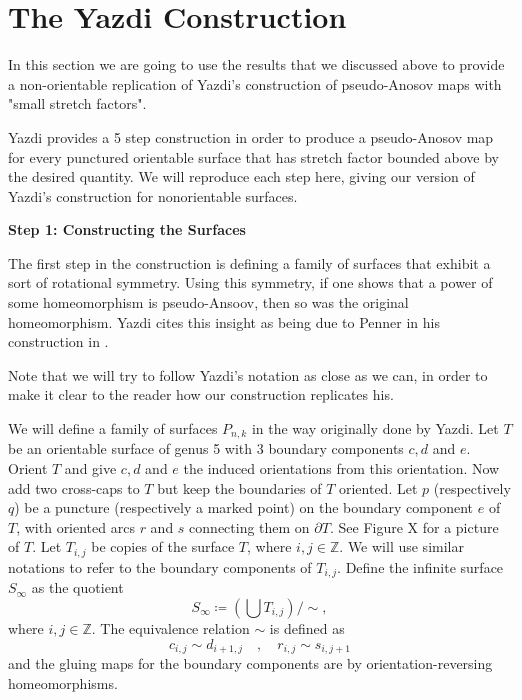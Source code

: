 \section{The Yazdi Construction}

In this section we are going to use the results that we discussed above to provide a non-orientable replication of Yazdi's construction of pseudo-Anosov maps with "small stretch factors".

Yazdi provides a 5 step construction in order to produce a pseudo-Anosov map for every punctured orientable surface that has stretch factor bounded above by the desired quantity. We will reproduce each step here, giving our version of Yazdi's construction for nonorientable surfaces. 

\textbf{Step 1: Constructing the Surfaces} 

The first step in the construction is defining a family of surfaces that exhibit a sort of rotational symmetry. Using this symmetry, if one shows that a power of some homeomorphism is pseudo-Ansoov, then so was the original homeomorphism. Yazdi cites this insight as being due to Penner in his construction in \cite{penner1991bounds}. 

Note that we will try to follow Yazdi's notation as close as we can, in order to make it clear to the reader how our construction replicates his.

We will define a family of surfaces $P_{n,k}$ in the way originally done by Yazdi. Let $T$ be an orientable surface of genus 5 with 3 boundary components $c,d$ and $e$. Orient $T$ and give $c,d$ and $e$ the induced orientations from this orientation. Now add two cross-caps to $T$ but keep the boundaries of $T$ oriented. Let $p$ (respectively $q$) be a puncture (respectively a marked point) on the boundary component $e$ of $T$, with oriented arcs $r$ and $s$ connecting them on $\partial T$. See Figure X for a picture of $T$. Let $T_{i,j}$ be copies of the surface $T$, where $i,j \in \mathbb{Z}$. We will use similar notations to refer to the boundary components of $T_{i,j}$. Define the infinite surface $S_\infty$ as the quotient
$$S_\infty \coloneqq \left( \bigcup T_{i,j} \right)/\sim,$$
where $i,j \in \mathbb{Z}$. The equivalence relation $\sim$ is defined as $$c_{i,j} \sim d_{i+1,j} \hspace{1em}, \hspace{1em} r_{i,j} \sim s_{i,j+1}$$ and the gluing maps for the boundary components are by orientation-reversing homeomorphisms.

